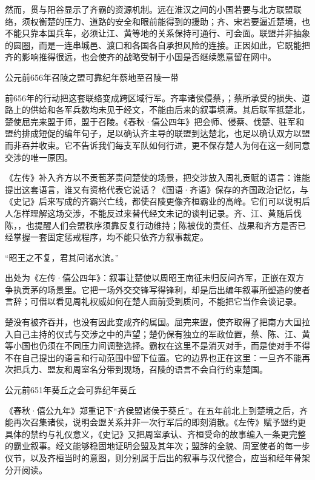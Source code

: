 然而，贯与阳谷显示了齐霸的资源机制。远在淮汉之间的小国若要与北方联盟联络，须权衡楚的压力、道路的安全和眼前能得到的援助；齐、宋若要逼近楚境，也不能只靠本国兵车，必须让江、黄等地的关系保持可通行、可会面。联盟并非抽象的圆圈，而是一连串城邑、渡口和各国各自承担风险的连接。正因如此，它既能把齐的影响推得很远，也会使齐的战略受制于小国是否继续愿意留在网中。

\begin{event}{公元前656年}{召陵之盟}{可靠纪年}{蔡地至召陵一带}

前656年的行动把这套联络变成跨区域行军。齐率诸侯侵蔡，；蔡所承受的损失、道路上的供给和各军兵数均未见于经文，不能由后来的叙事填满。其后联军抵楚北，楚使屈完来盟于师，盟于召陵。《春秋·僖公四年》把会师、侵蔡、伐楚、驻军和盟约排成短促的编年句子，足以确认齐主导的联盟到达楚北，也足以确认双方以盟而非吞并收束。它不告诉我们每支军队如何行进，更不保存楚人为何在这一刻同意交涉的唯一原因。

《左传》补入齐方以不贡苞茅责问楚使的场景，把交涉放入周礼贡赋的语言：谁能提出这套语言，谁又有资格代表它说话？《国语·齐语》保存的齐国政治记忆，与《史记》后来写成的齐霸兴亡线，都使召陵更像齐桓霸业的高峰。它们可以说明后人怎样理解这场交涉，不能反过来替代经文未记的谈判记录。齐、江、黄随后伐陈，，也提醒人们会盟秩序须靠反复行动维持；陈被伐的责任、战果和齐方是否已经掌握一套固定惩戒程序，均不能只依齐方叙事裁定。
\end{event}

\begin{textwindow}[水滨的反问]
“昭王之不复，君其问诸水滨。”

出处为《左传·僖公四年》：叙事让楚使以周昭王南征未归反问齐军，正嵌在双方争执贡茅的场景里。它把一场外交交锋写得锋利，却是后出编年叙事所塑造的使者言辞；可借以看见周礼权威如何在楚人面前受到质问，不能把它当作会谈记录。
\end{textwindow}

楚没有被齐吞并，也没有因此变成齐的属国。屈完来盟，使齐取得了把南方大国拉入自己主持的仪式与交涉之中的声望；楚仍保有独立的军政位置，蔡、陈、江、黄等小国也仍须在不同压力间调整选择。霸权在这里不是消灭对手，而是使对手不得不在自己提出的语言和行动范围中留下位置。它的边界也正在这里：一旦齐不能再次把兵力、盟友和周室名分带到现场，召陵的语言不会自行约束楚国。

\begin{event}{公元前651年}{葵丘之会}{可靠纪年}{葵丘}

《春秋·僖公九年》郑重记下“齐侯盟诸侯于葵丘”。在五年前北上到楚境之后，齐能再次召集诸侯，说明会盟关系并非一次行军后的即刻消散。《左传》赋予盟约更具体的禁约与礼仪意义，《史记》又把周室承认、齐桓受命的故事编入一条更完整的霸业叙事。经文能够稳固地证明会盟及其年次；盟辞的全貌、周室使者的每一步仪节，以及齐桓当时的意图，则分别属于后出的叙事与汉代整合，应当和经年骨架分开阅读。
\end{event}

